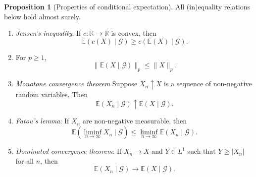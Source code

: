 \documentclass[parskip=full]{article}
\theoremstyle{definition}
\newtheorem*{proposition}{Proposition}
\newcommand{\R}{\mathbb{R}}
\newcommand{\1}{\mathbbm{1}}
\newcommand{\E}{\mathbb{E}}
\begin{document}
\begin{proposition}[Properties of conditional expectation]
    All (in)equality relations below hold almost surely.
    \begin{enumerate}
      \item \emph{Jensen's inequality}: If $c: \R \to \R$ is convex, then
        \[
          \E(c(X) \mid \mathcal{G}) \geq c(\E(X) \mid \mathcal{G}).
        \]
        \item For $p \geq 1$,
        \[
          \|\E(X \mid \mathcal{G})\|_p \leq \|X\|_p.
        \]
      \item \emph{Monotone convergence theorem} Suppose $X_n \uparrow X$ is a sequence of non-negative random variables. Then
        \[
          \E(X_n\mid \mathcal{G}) \uparrow \E(X \mid \mathcal{G}).
        \]
      \item \emph{Fatou's lemma}: If $X_n$ are non-negative measurable, then
        \[
          \E\left(\liminf_{n \to \infty} X_n \mid \mathcal{G}\right) \leq \liminf_{n \to \infty} \E(X_n \mid \mathcal{G}).
        \]
      \item \emph{Dominated convergence theorem}: If $X_n \to X$ and $Y \in L^1$ such that $Y \geq |X_n|$ for all $n$, then
        \[
          \E(X_n \mid \mathcal{G}) \to \E(X \mid \mathcal{G}).
        \]
    \end{enumerate}
\end{proposition}
\end{document}
